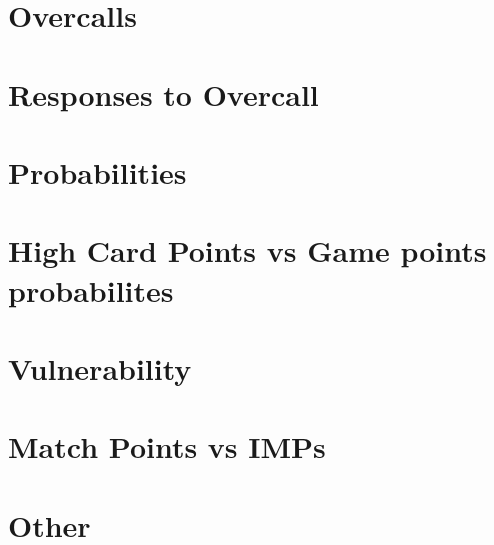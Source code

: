 \documentclass{article}
\begin{document}
\section{Overcalls}
\section{Responses to Overcall}

\section{Probabilities}
\section{High Card Points vs Game points probabilites}
\section{Vulnerability}
\section{Match Points vs IMPs}
\section{Other}
\end{document}
